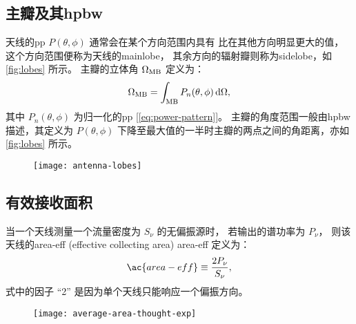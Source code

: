\subsection{主瓣及其\acl*{hpbw}}

天线的\ac{pp} $P(\theta,\phi)$ 通常会在某个方向范围内具有
比在其他方向明显更大的值，
这个方向范围便称为天线的\acf{mainlobe}，
其余方向的辐射瓣则称为\acf{sidelobe}，如\autoref{fig:lobes} 所示。
主瓣的立体角 $\Omega_{\mathrm{MB}}$ 定义为：
\begin{equation}
  \label{eq:omega-mb}
  \Omega_{\mathrm{MB}} = \int_{\mathrm{MB}} P_n(\theta,\phi) \,\mathrm{d}\Omega ,
\end{equation}
其中 $P_n(\theta,\phi)$ 为归一化的\ac{pp} [\autoref{eq:power-pattern}]。
主瓣的角度范围一般由\acf{hpbw}描述，其定义为 $P(\theta,\phi)$
下降至最大值的一半时主瓣的两点之间的角距离，亦如\autoref{fig:lobes} 所示。

\begin{figure}[htp]
  \centering
  \texttt{[image: antenna-lobes]}
  \label{fig:lobes}
\end{figure}

\subsection{有效接收面积}

当一个天线测量一个流量密度为 $S_{\nu}$ 的无偏振源时，
若输出的谱功率为 $P_{\nu}$，
则该天线的\acl{area-eff} (effective collecting area) \ac{area-eff}
定义为：
\begin{equation}
  \label{eq:area-eff}
  \ac{area-eff} \equiv \frac{2 P_{\nu}}{S_{\nu}} ,
\end{equation}
式中的因子 \enquote{2} 是因为单个天线只能响应一个偏振方向。

\begin{figure}[htp]
  \centering
  \texttt{[image: average-area-thought-exp]}
  \label{fig:area-avg-exp}
\end{figure}

